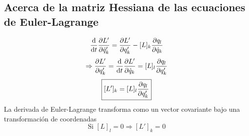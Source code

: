 \subsection{Acerca de la matriz Hessiana de las ecuaciones de Euler-Lagrange}
\begin{equation}
  \dv{t}\pdv{L'}{\dot{q}'_k}=\pdv{L'}{q'_k}-[L]_k\pdv{q_l}{\dot{q}_k}
\end{equation}
\begin{equation}
  \Rightarrow \pdv{L'}{q'_k}=\dv{t}\pdv{L'}{\dot{q}_k}=[L]_l\pdv	{q_l}{q'_k}
\end{equation}
\begin{equation}
\boxed{[L']_k=[L]_l\pdv{q_l}{q'_k}}
\end{equation}
La derivada de Euler-Lagrange transforma como un vector covariante bajo una transformación de coordenadas
\begin{equation}
  \mbox{Si }[L]_l=0 \Rightarrow [L']_k=0
\end{equation}



